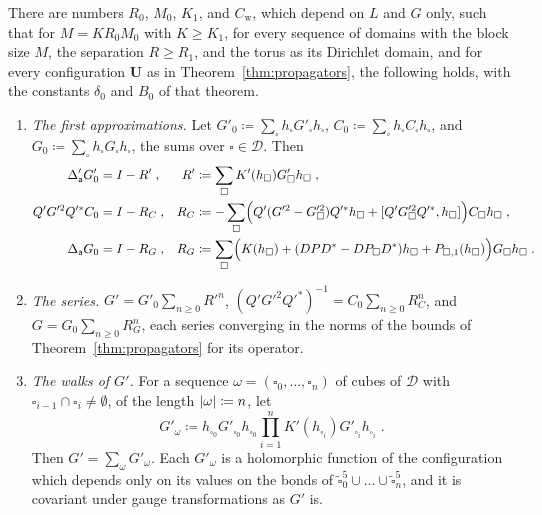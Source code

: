 \documentclass[11pt]{preprint}
\DeclarePairedDelimiter{\abs}{\lvert}{\rvert}
\numberwithin{equation}{section}
\begin{document}
\begin{theorem}\label{thm:walks}
There are numbers $R_0$, $M_0$, $K_1$, and $C_{\mathrm w}$, which depend on $L$ and $G$ only, such that for $M = KR_0M_0$ with $K \geqslant K_1$, for every sequence of domains with the block size $M$, the separation $R \geqslant R_1$, and the torus as its Dirichlet domain, and for every configuration $\mathbf U$ as in Theorem~\ref{thm:propagators}, the following holds, with the constants $\delta_0$ and $B_0$ of that theorem.
\begin{enumerate}[label=(\roman*)]
\item \emph{The first approximations.} Let $G'_0 \coloneqq \sum_\square h_\square G'_\square h_\square$, $C_0 \coloneqq \sum_\square h_\square C_\square h_\square$, and $G_0 \coloneqq \sum_\square h_\square G_\square h_\square$, the sums over $\square \in \mathscr D$. Then
\begin{align}
    \Delta'_{\mathsf a}G'_0 &= I - R'\;, & R' &\coloneqq \sum_\square K'(h_\square)G'_\square h_\square\;,\label{eq:first-remainder-scalar}\\
    Q'G'^2Q'^*C_0 &= I - R_C\;, & R_C &\coloneqq -\sum_\square\Bigl(Q'(G'^2 - G'^2_\square)Q'^*h_\square + [Q'G'^2_\square Q'^*, h_\square]\Bigr)C_\square h_\square\;,\label{eq:first-remainder-block}\\
    \Delta_{\mathsf a}G_0 &= I - R_G\;, & R_G &\coloneqq \sum_\square\Bigl(K(h_\square) + (DPD^* - DP_\square D^*)h_\square + P_{\square,1}(h_\square)\Bigr)G_\square h_\square\;.\label{eq:first-remainder}
\end{align}
\item \emph{The series.} $G' = G'_0\sum_{n \geqslant 0}R'^n$, $(Q'G'^2Q'^*)^{-1} = C_0\sum_{n \geqslant 0}R_C^n$, and $G = G_0\sum_{n \geqslant 0}R_G^n$, each series converging in the norms of the bounds of Theorem~\ref{thm:propagators} for its operator.
\item \emph{The walks of $G'$.} For a sequence $\omega = (\square_0, \dots, \square_n)$ of cubes of $\mathscr D$ with $\square_{i-1} \cap \square_i \neq \emptyset$, of the length $\abs\omega \coloneqq n$, let
\begin{equation}\label{eq:walk-term}
    G'_\omega \coloneqq h_{\square_0}G'_{\square_0}h_{\square_0}\prod_{i=1}^{n}K'(h_{\square_i})G'_{\square_i}h_{\square_i}\;.
\end{equation}
Then $G' = \sum_\omega G'_\omega$. Each $G'_\omega$ is a holomorphic function of the configuration which depends only on its values on the bonds of $\tilde\square_0^5 \cup \dots \cup \tilde\square_n^5$, and it is covariant under gauge transformations as $G'$ is.

\end{enumerate}
\end{theorem}
\end{document}

